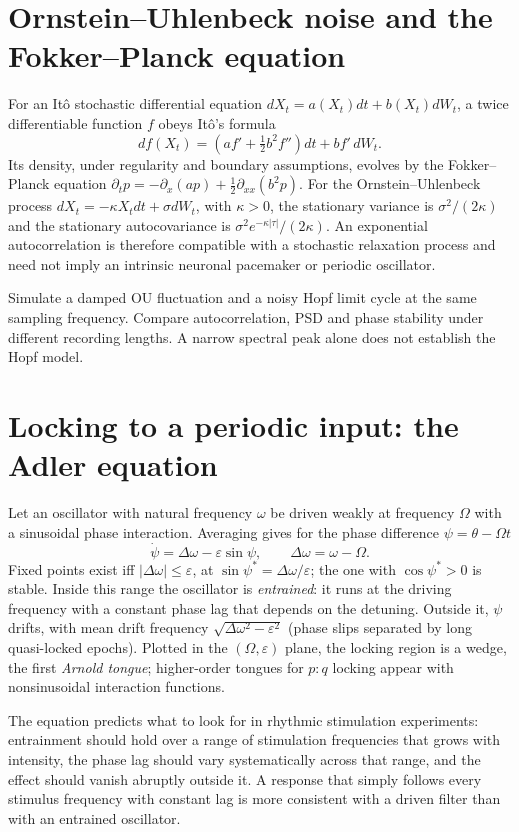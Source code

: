 \section{Ornstein--Uhlenbeck noise and the Fokker--Planck equation}
For an It\^o stochastic differential equation
$dX_t=a(X_t)dt+b(X_t)dW_t$, a twice differentiable
function $f$ obeys It\^o's formula
\[
df(X_t)=\left(af'+\tfrac12 b^2f''\right)dt
+b f'\,dW_t.
\]
Its density, under regularity and boundary assumptions,
evolves by the Fokker--Planck equation
$\partial_tp=-\partial_x(ap)
 +\tfrac12\partial_{xx}(b^2p)$.
For the Ornstein--Uhlenbeck process
$dX_t=-\kappa X_tdt+\sigma dW_t$, with $\kappa>0$,
the stationary variance is $\sigma^2/(2\kappa)$ and the
stationary autocovariance is
$\sigma^2e^{-\kappa|\tau|}/(2\kappa)$.
An exponential autocorrelation is therefore compatible with
a stochastic relaxation process and need not imply an intrinsic
neuronal pacemaker or periodic oscillator.

\begin{example}
Simulate a damped OU fluctuation and a noisy Hopf limit cycle
at the same sampling frequency. Compare autocorrelation,
PSD and phase stability under different recording lengths.
A narrow spectral peak alone does not establish the Hopf model.
\end{example}
\section{Locking to a periodic input: the Adler equation}
Let an oscillator with natural frequency $\omega$ be driven weakly at
frequency $\Omega$ with a sinusoidal phase interaction. Averaging gives
for the phase difference $\psi=\theta-\Omega t$
\[
\dot\psi=\Delta\omega-\varepsilon\sin\psi,\qquad\Delta\omega=\omega-\Omega.
\]
Fixed points exist iff $|\Delta\omega|\le\varepsilon$, at
$\sin\psi^\ast=\Delta\omega/\varepsilon$; the one with $\cos\psi^\ast>0$ is
stable. Inside this range the oscillator is \emph{entrained}: it runs
at the driving frequency with a constant phase lag that depends on the
detuning. Outside it, $\psi$ drifts, with mean drift frequency
$\sqrt{\Delta\omega^2-\varepsilon^2}$ (phase slips separated by long
quasi-locked epochs). Plotted in the $(\Omega,\varepsilon)$ plane, the
locking region is a wedge, the first \emph{Arnold tongue}; higher-order
tongues for $p\!:\!q$ locking appear with nonsinusoidal interaction
functions.

The equation predicts what to look for in rhythmic stimulation
experiments: entrainment should hold over a range of stimulation
frequencies that grows with intensity, the phase lag should vary
systematically across that range, and the effect should vanish abruptly
outside it. A response that simply follows every stimulus frequency with
constant lag is more consistent with a driven filter than with an
entrained oscillator.

